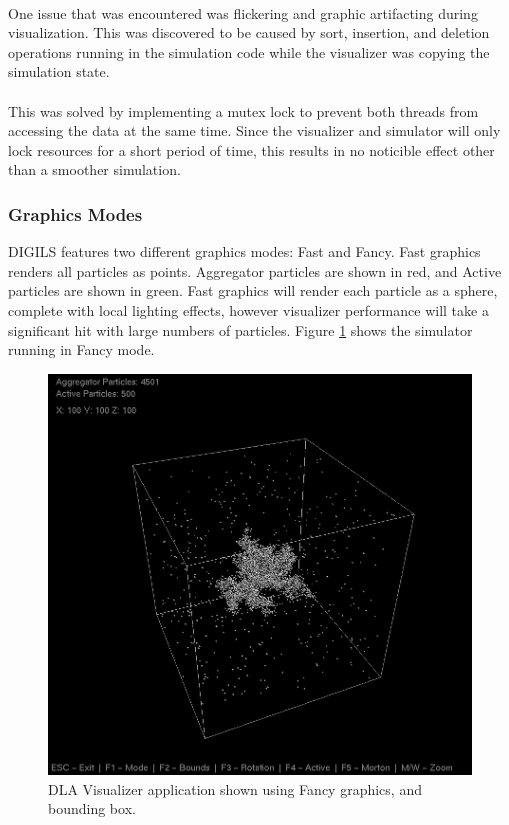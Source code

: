 \documentclass[fleqn,10pt]{UserGuideArx} %
\begin{document}
~\\
One issue that was encountered was flickering and graphic artifacting during visualization. This was discovered to be caused by sort, insertion, and deletion operations running in the simulation code while the visualizer was copying the simulation state.\\~\\
This was solved by implementing a mutex lock to prevent both threads from accessing the data at the same time. Since the visualizer and simulator will only lock resources for a short period of time, this results in no noticible effect other than a smoother simulation.\\

\subsubsection{Graphics Modes}
DIGILS features two different graphics modes: Fast and Fancy. Fast graphics renders all particles as points. Aggregator particles are shown in red, and Active particles are shown in green. Fast graphics will render each particle as a sphere, complete with local lighting effects, however visualizer performance will take a significant hit with large numbers of particles. Figure \ref{fig:Fancy} shows the simulator running in Fancy mode.

\begin{figure}[!h]\centering %
    \includegraphics[width=\linewidth]{images/Fancy.png}
    \caption{DLA Visualizer application shown using Fancy graphics, and bounding box.}
    \label{fig:Fancy}
    \end{figure}
\end{document}
